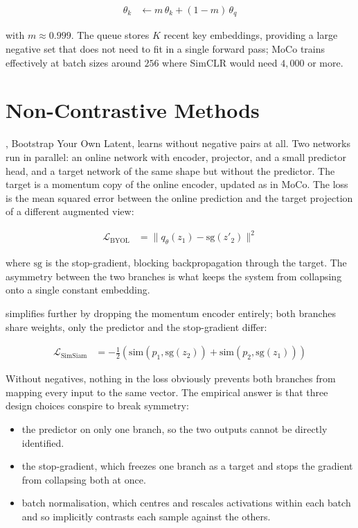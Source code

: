 \begin{align*}
    \theta_k &\leftarrow m\, \theta_k + (1 - m)\, \theta_q
\end{align*}

with $m \approx 0.999$. The queue stores $K$ recent key embeddings, providing a large negative set that does not need to fit in a single forward pass; MoCo trains effectively at batch sizes around $256$ where SimCLR would need $4{,}000$ or more.


\section{Non-Contrastive Methods}


\cite{Grill2020BYOL}, Bootstrap Your Own Latent, learns without negative pairs at all. Two networks run in parallel: an online network with encoder, projector, and a small predictor head, and a target network of the same shape but without the predictor. The target is a momentum copy of the online encoder, updated as in MoCo. The loss is the mean squared error between the online prediction and the target projection of a different augmented view:

\begin{align*}
    \mathcal{L}_{\text{BYOL}} &= \|q_\theta(z_1) - \text{sg}(z'_2)\|^2
\end{align*}

where $\text{sg}$ is the stop-gradient, blocking backpropagation through the target. The asymmetry between the two branches is what keeps the system from collapsing onto a single constant embedding.

\vspace{1.0em}
\cite{Chen2021SimSiam} simplifies further by dropping the momentum encoder entirely; both branches share weights, only the predictor and the stop-gradient differ:

\begin{align*}
    \mathcal{L}_{\text{SimSiam}} &= -\tfrac{1}{2}\!\left( \text{sim}(p_1, \text{sg}(z_2)) + \text{sim}(p_2, \text{sg}(z_1)) \right)
\end{align*}

\vspace{1.0em}
 Without negatives, nothing in the loss obviously prevents both branches from mapping every input to the same vector. The empirical answer is that three design choices conspire to break symmetry:
\begin{itemize}
    \item the predictor on only one branch, so the two outputs cannot be directly identified.
    \item the stop-gradient, which freezes one branch as a target and stops the gradient from collapsing both at once.
    \item batch normalisation, which centres and rescales activations within each batch and so implicitly contrasts each sample against the others.
\end{itemize}


